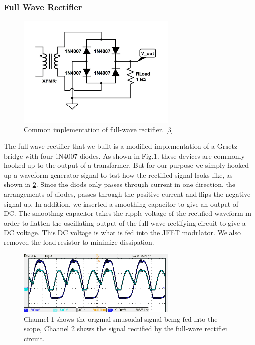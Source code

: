 \documentclass[twocolumn]{article}
\begin{document}
\subsubsection{Full Wave Rectifier}
\begin{figure}[h!]
 \centering
 \includegraphics[width=220pt]{figure/full_wave_rectifier.jpg}
\caption{Common implementation of full-wave rectifier. {\footnotesize[3]}}
\label{rectifier}
\end{figure}
The full wave rectifier that we built is a modified implementation of a Graetz bridge with four 1N4007 diodes. As shown in Fig.\ref{rectifier}, these devices are commonly hooked up to the output of a transformer. But for our purpose we simply hooked up a waveform generator signal to test how the rectified signal looks like, as shown in \ref{full_wave_scope}. Since the diode only passes through current in one direction, the arrangements of diodes, passes through the positive current and flips the negative signal up. In addition, we inserted a smoothing capacitor to give an output of DC. The smoothing capacitor takes the ripple voltage of the rectified waveform in order to flatten the oscillating output of the full-wave rectifying circuit  to give a DC voltage. This DC voltage is what is fed into the JFET modulator. We also removed the load resistor to minimize dissipation.  
\begin{figure}[h!]
 \centering
 \includegraphics[width=220pt]{figure/full_wave_scope.PNG}
\caption{Channel 1 shows the original sinusoidal signal being fed into the scope, Channel 2 shows the signal rectified by the full-wave rectifier circuit. }
\label{full_wave_scope}
\end{figure}
\end{document}
